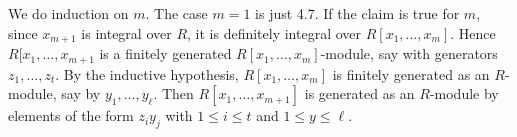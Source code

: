 We do induction on $m$. The case $m = 1$ is just 4.7. If the claim is true for
$m$, since $x_{m+1}$ is integral over $R$, it is definitely integral over
$R[x_1, \ldots, x_m]$. Hence $R[x_1, \ldots, x_{m+1}$ is a finitely generated
$R[x_1, \ldots, x_m]$-module, say with generators $z_1, \ldots, z_t$. By
the inductive hypothesis, $R[x_1, \ldots, x_m]$ is finitely generated as an $R$-module,
say by $y_1, \ldots, y_{\ell}$. Then $R[x_1, \ldots, x_{m+1}]$ is generated as
an $R$-module by elements of the form $z_iy_j$ with $1\leq i\leq t$ and
$1\leq y\leq\ell$.
